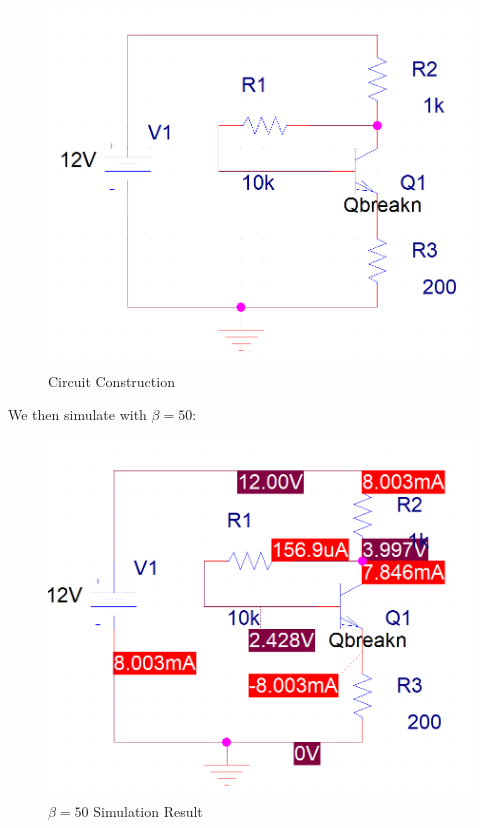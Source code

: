 \begin{enumerate}
\begin{enumerate}
        \begin{figure}[H]
          \centering
          \includegraphics[width=.9\textwidth]{Figures/HW6-3a}
          \caption{Circuit Construction}
          \label{fig:8}
        \end{figure}

        We then simulate with $\beta=50$:

        \begin{figure}[H]
          \centering
          \includegraphics[width=.9\textwidth]{Figures/HW6-3b}
          \caption{$\beta=50$ Simulation Result}
          \label{fig:9}
        \end{figure}


\end{enumerate}
\end{enumerate}
